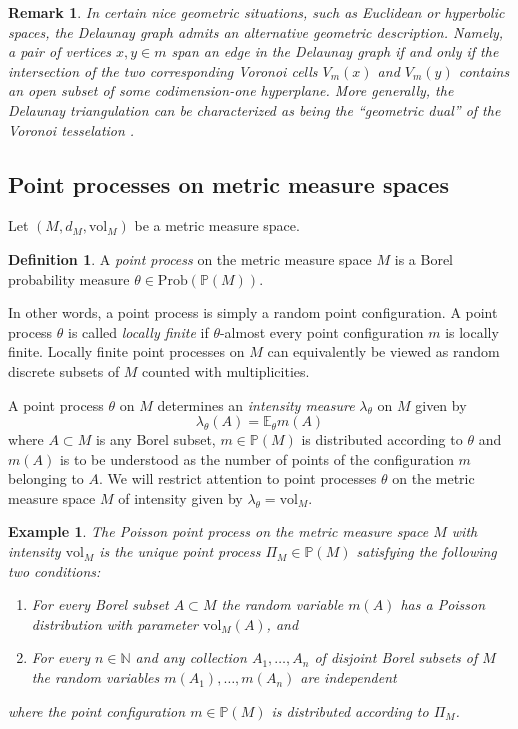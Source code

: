 \documentclass{amsart}
\newcommand{\NN}{\mathbb{N}}
\newcommand{\EE}{\mathbb{E}}
\newcommand{\Points}{\mathbb{P}}
\newcommand{\vol}{\mathrm{vol}}
\newcommand{\Prob}[1]{\mathrm{Prob}\left(#1\right)}
\theoremstyle{plain}
\newtheorem{remark}[theorem]{Remark}
\newtheorem{example}[theorem]{Example}
\numberwithin{equation}{section}
\theoremstyle{definition}
\newtheorem{definition}[theorem]{Definition}
\begin{document}
\begin{remark}
In certain nice geometric situations, such as Euclidean or hyperbolic spaces, the Delaunay graph admits an alternative geometric description. Namely, a pair of vertices $x,y \in m$ span an edge in the Delaunay graph if and only if the intersection of the two corresponding Voronoi cells $V_m(x)$ and $V_m(y)$ contains an open subset of some codimension-one hyperplane. More generally, the Delaunay triangulation can be characterized as being the \enquote{geometric dual} of the  Voronoi tesselation \cite[\S5]{deblois2018delaunay}. 
\end{remark}



\subsection{Point processes on metric measure spaces}
Let $(M,d_M,\vol_M)$ be a metric measure space.
\begin{definition}
A \emph{point process} on the metric measure space $M$
is a Borel probability measure $\theta \in \Prob{\Points(M)}$.
\end{definition}

In other words, a point process is simply a random point configuration. A point process $\theta$ is called \emph{locally finite} if $\theta$-almost every point configuration $m$ is locally finite. Locally finite point processes on $M$ can equivalently be viewed as random discrete subsets of $M$ counted with multiplicities.

A point process $\theta$ on $M$ determines an \emph{intensity measure} $\lambda_\theta$ on $M$ given by 
\begin{equation}
    \lambda_\theta(A) = \EE_\theta m(A)
\end{equation} 
where $A \subset M$ is any Borel subset, $m \in \Points(M)$ is distributed according to $\theta$ and $m(A)$ is to be understood as the number of points of the configuration $m$ belonging to $A$. We will restrict attention to point processes $\theta$ on the metric measure space $M$ of intensity given by $\lambda_\theta = \vol_M$.

\begin{example}
\label{example:poisson point process}
The \emph{Poisson point process} on the metric measure space $M$ with intensity $\vol_M$  is the unique point process $\Pi_M \in \Points(M)$ satisfying the following two conditions:
\begin{enumerate}
\item For every Borel subset $A \subset M$ the random variable $m(A)$ has a Poisson  distribution with parameter $\vol_M(A)$, and 
\item For every $n \in \NN$ and any collection $A_1,\ldots,A_n$ of disjoint Borel subsets of $M$ the random variables $m(A_1),\ldots,m(A_n)$ are independent 
\end{enumerate}
where the point configuration $m \in \Points(M)$ is distributed according to $\Pi_M$.
\end{example}
\end{document}
